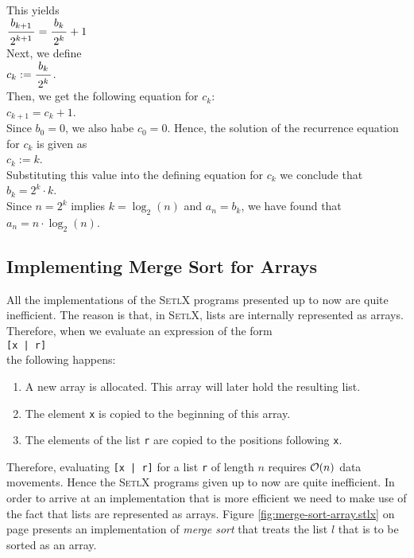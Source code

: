 This yields
\\[0.2cm]
\hspace*{1.3cm}
$\bruch{b_{k+1}}{2^{k+1}} = \bruch{b_k}{2^k} + 1$ 
\\[0.2cm]
Next, we define
\\[0.2cm]
\hspace*{1.3cm}
$c_k := \bruch{b_k}{2^k}$.
\\[0.2cm]
Then, we get the following equation for $c_k$:
\\[0.2cm]
\hspace*{1.3cm}
$c_{k+1} = c_k + 1$.
\\[0.2cm]
Since $b_0 = 0$, we also habe $c_0 = 0$.  Hence, the solution of the recurrence equation for $c_k$
is given as
\\[0.2cm]
\hspace*{1.3cm}
$c_k := k$.
\\[0.2cm]
Substituting this value into the defining equation for $c_k$ we conclude that
\\[0.2cm]
\hspace*{1.3cm}
$b_k = 2^k \cdot k$.
\\[0.2cm]
Since $n = 2^k$ implies $k = \log_2(n)$ and $a_n = b_k$, we have found that
\\[0.2cm]
\hspace*{1.3cm}
$a_n = n \cdot \log_2(n)$. 


\subsection{Implementing Merge Sort for Arrays}
All the implementations of the \textsc{SetlX} programs presented up to now are quite inefficient.  The
reason is that, in \textsc{SetlX}, lists are internally represented as arrays.  Therefore, when
we evaluate an expression of the form 
\\[0.2cm]
\hspace*{1.3cm}
\texttt{[x | r]}
\\[0.2cm]
the following happens:
\begin{enumerate}
\item A new array is allocated.  This array will later hold the resulting list.
\item The element \texttt{x} is copied to the beginning of this array.
\item The elements of the list \texttt{r} are copied to the positions following \texttt{x}.
\end{enumerate}
Therefore, evaluating \texttt{[x | r]} for a list \texttt{r} of length $n$ requires $\mathcal{O}(n)$ data
movements.  Hence the \textsc{SetlX} programs given up to now are quite inefficient.  In order to arrive at an
implementation that is more efficient we need to make use of the fact that lists are represented as arrays.
Figure \ref{fig:merge-sort-array.stlx} on page \pageref{fig:merge-sort-array.stlx} presents
an implementation of \emph{merge sort} that treats the list $l$ that is to be sorted as an array.


